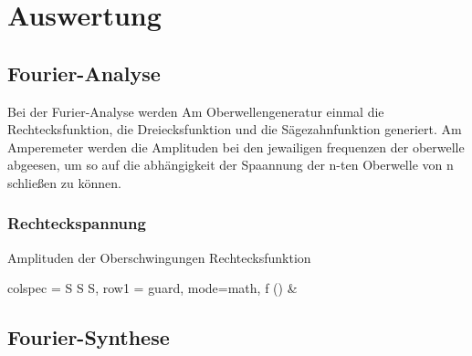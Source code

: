 \section{Auswertung}
\label{sec:Auswertung}

\subsection{Fourier-Analyse}
Bei der Furier-Analyse werden Am Oberwellengeneratur einmal die Rechtecksfunktion,
die Dreiecksfunktion und die Sägezahnfunktion generiert. Am Amperemeter werden 
die Amplituden bei den jewailigen frequenzen der oberwelle 
abgeesen, um so auf die abhängigkeit der Spaannung der n-ten Oberwelle von n schließen zu können.
\subsubsection{Rechteckspannung}
\begin{table}
    \caption{Amplituden der Oberschwingungen Rechtecksfunktion}
    \label{tab:j1}
    \begin{tablr}{
        colspec = {S S S},
        row{1} = {guard, mode=math},
    }
    \toprule
    f (\unit{\herz}) &  
    \end{tablr}
\end{table}


\subsection{Fourier-Synthese}